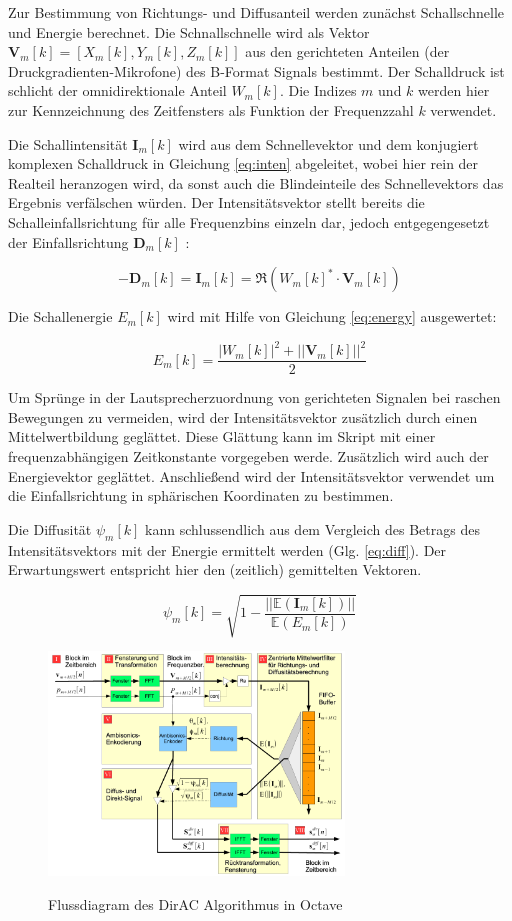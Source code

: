 Zur Bestimmung von Richtungs- und Diffusanteil werden zunächst Schallschnelle und Energie berechnet. Die Schnallschnelle wird als Vektor $\textbf{V}_{m}[k] = [X_{m}[k], Y_{m}[k], Z_{m}[k]]$ aus den gerichteten Anteilen (der Druckgradienten-Mikrofone) des B-Format Signals bestimmt. Der Schalldruck ist schlicht der omnidirektionale Anteil $W_{m}[k]$. Die Indizes $m$ und $k$ werden hier zur Kennzeichnung des Zeitfensters als Funktion der Frequenzzahl $k$ verwendet.

Die Schallintensität $\textbf{I}_{m}[k]$ wird aus dem Schnellevektor und dem konjugiert komplexen Schalldruck in Gleichung \ref{eq:inten} abgeleitet, wobei hier rein der Realteil heranzogen wird, da sonst auch die Blindeinteile des Schnellevektors das Ergebnis verfälschen würden. Der Intensitätsvektor stellt bereits die Schalleinfallsrichtung für alle Frequenzbins einzeln dar, jedoch entgegengesetzt der Einfallsrichtung $\textbf{D}_{m}[k]$ :

\begin{equation}
    -\textbf{D}_{m}[k] = \textbf{I}_{m}[k] = \Re(W_{m}[k]^{*} \cdot \textbf{V}_{m}[k])
    \label{eq:inten}
\end{equation}

Die Schallenergie $E_{m}[k]$ wird mit Hilfe von Gleichung \ref{eq:energy} ausgewertet:

\begin{equation}
    E_{m}[k] = \frac{|W_{m}[k]|^2+||\textbf{V}_{m}[k]||^2}{2}
    \label{eq:energy}
\end{equation}

Um Sprünge in der Lautsprecherzuordnung von gerichteten Signalen bei raschen Bewegungen zu vermeiden, wird der Intensitätsvektor zusätzlich durch einen Mittelwertbildung geglättet. Diese Glättung kann im Skript mit einer frequenzabhängigen Zeitkonstante vorgegeben werde. Zusätzlich wird auch der Energievektor geglättet. Anschließend wird der Intensitätsvektor verwendet um die Einfallsrichtung in sphärischen Koordinaten zu bestimmen.

Die Diffusität $\psi_{m}[k]$ kann schlussendlich aus dem Vergleich des Betrags des Intensitätsvektors mit der Energie ermittelt werden (Glg. \ref{eq:diff}). Der Erwartungswert entspricht hier den (zeitlich) gemittelten Vektoren.

\begin{equation}
    \psi_{m}[k] = \sqrt{1 - \frac{||\mathbb{E}(\textbf{I}_{m}[k])||}{\mathbb{E}(E_{m}[k])}}
    \label{eq:diff}
\end{equation}

\begin{figure}[!ht]
  \centering
  \includegraphics[width=0.7\textwidth]{implementierung/plots/flow.png}
  \label{fig:flow}
  \caption{Flussdiagram des DirAC Algorithmus in Octave\protect\footnotemark}
\end{figure}

